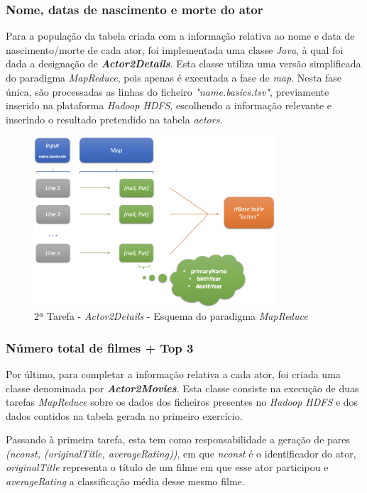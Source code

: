 \documentclass[a4paper]{report}
\begin{document}
{			\subsubsection{Nome, datas de nascimento e morte do ator} \label{sssec:Task2-3-1}
			Para a população da tabela criada com a informação relativa ao nome e data de nascimento/morte de cada ator, foi implementada uma classe \textit{Java}, à qual foi dada a designação de \textbf{\textit{Actor2Details}}.
			Esta classe utiliza uma versão simplificada do paradigma \textit{MapReduce}, pois apenas é executada a fase de \textit{map}.
			Nesta fase única, são processadas as linhas do ficheiro \textit{"name.basics.tsv"}, previamente inserido na plataforma \textit{Hadoop HDFS}, escolhendo a informação relevante e inserindo o resultado pretendido na tabela \textit{actors}.
			\begin{figure}[H]
				\centering
				\includegraphics[width=0.8\textwidth]{Imagens/2ª Tarefa - Actor2Details - Esquema MapReduce.png}
				\caption{2ª Tarefa - \textit{Actor2Details} - Esquema do paradigma \textit{MapReduce}}
				\label{fig:18}
			\end{figure}

			\subsubsection{Número total de filmes + Top 3} \label{sssec:Task2-3-2}
			Por último, para completar a informação relativa a cada ator, foi criada uma classe denominada por \textbf{\textit{Actor2Movies}}. Esta classe consiste na execução de duas tarefas \textit{MapReduce} sobre os dados dos ficheiros presentes no \textit{Hadoop HDFS} e dos dados contidos na tabela gerada no primeiro exercício.
			
			Passando à primeira tarefa, esta tem como responsabilidade a geração de pares \textit{(nconst, (originalTitle, averageRating))}, em que \textit{nconst} é o identificador do ator, \textit{originalTitle} representa o título de um filme em que esse ator participou e \textit{averageRating} a classificação média desse mesmo filme.
			
}
\end{document}
